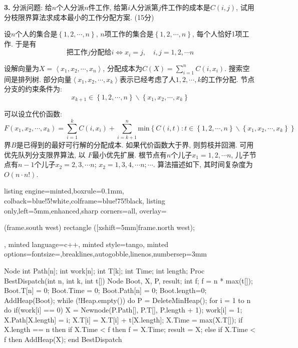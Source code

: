 \documentclass{article}
\begin{document}
\textbf{3.} 分派问题: 给$n$个人分派$n$件工作, 给第$i$人分派第$j$件工作的成本是$C(i,j)$, 试用分枝限界算法求成本最小的工作分配方案. (15分)

\solution 设$n$个人的集合是$\left\{ 1,2,\cdots,n \right\}$, $n$项工作的集合是$\left\{ 1,2,\cdots,n \right\}$, 每个人恰好1项工作. 于是有
$$\text{把工作}j\text{分配给}i\Leftrightarrow x_i=j,\quad i,j=1,2,\cdots n
$$

设解向量为$X=\left< x_1,x_2,\cdots ,x_n \right>	$, 分配成本为$\displaystyle C\left( X \right) =\sum_{i=1}^n{C\left( i,x_i \right)}	$. 搜索空间是排列树. 部分向量$\left< x_1,x_2,\cdots ,x_k \right> $表示已经考虑了人$1,2,\cdots,k$的工作分配. 节点分支的约束条件为:$$x_{k+1}\in \left\{ 1,2,\cdots ,n \right\} \backslash \left\{ x_1,x_2,\cdots ,x_k \right\} 
$$

可以设立代价函数:$$F\left( x_1,x_2,\cdots ,x_k \right) =\sum_{i=1}^k{C\left( i,x_i \right)}+\sum_{i=k+1}^n{\text{min} \left\{ C\left( i,t \right) :t\in \left\{ 1,2,\cdots ,n \right\} \backslash \left\{ x_1,x_2,\cdots ,x_k \right\} \right\}}
$$
界$B$是已得到的最好可行解的分配成本. 如果代价函数大于界, 则剪枝并回溯. 可用优先队列分支限界算法, 以
$F$最小优先扩展. 根节点有$n$个儿子$x_1=1,2,\cdots n$, 儿子节点有$n-1$个儿子$x_2=2,3,\cdots n$; $x_2=1,3,4,\cdots n;\cdots $. 算法描述如下, 其时间复杂度为$O(n\cdot n!)$.
\begin{tcblisting}{listing engine=minted,boxrule=0.1mm,
    colback=blue!5!white,colframe=blue!75!black,
    listing only,left=5mm,enhanced,sharp corners=all,
    overlay={\begin{tcbclipinterior} (frame.south west)
    rectangle ([xshift=5mm]frame.north west);\end{tcbclipinterior}},
    minted language=c++,
    minted style=tango,
    minted options={fontsize=\small,breaklines,autogobble,linenos,numbersep=3mm}}
    Node{
        int Path[n];
        int work[n];
        int T[k];
        int Time;
        int length;
    }
    Proc BestDispatch(int n, int k, int t[]){
        Node Boot, X, P, result;
        int f;
        f = n * max(t[]);
        Boot.T[n] = {0};
        Boot.Time = 0;
        Boot.Path[n] = {0};
        Boot.length=0;
        AddHeap(Boot);
        while (!Heap.empty()) do {
            P = DeleteMinHeap();
            for i = 1 to n do {
                if(work[i] == 0) {
                    X = Newnode(P.Path[], P.T[], P.length + 1);
                    work[i] = 1;
                }
                X.Path[X.length] = i;
                X.T[i] = X.T[i] + t[X.length];
                X.Time = max(X.T[]);
                if X.length == n then {
                    if X.Time < f then {
                        f = X.Time;
                        result = X;
                    }
                }
                else {
                    if X.Time < f then {
                        AddHeap(X);
                    }
                }
            }
        }
    }
    end {BestDispatch}
\end{tcblisting}
\end{document}
